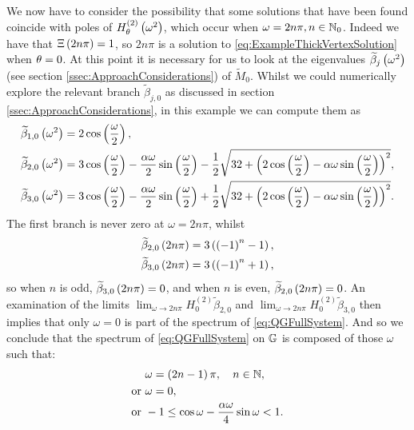 We now have to consider the possibility that some solutions that have been found coincide with poles of $H_\theta^{(2)}\left( \omega^2 \right)$, which occur when $\omega = 2n\pi, n\in\mathbb{N}_0$.
Indeed we have that $\Xi\left( 2n\pi \right)=1$, so $2n\pi$ is a solution to \eqref{eq:ExampleThickVertexSolution} when $\theta=0$.
At this point it is necessary for us to look at the eigenvalues $\widetilde{\beta}_j\left( \omega^2 \right)$ (see section \ref{ssec:ApproachConsiderations}) of $\tilde{M}_0$.
Whilst we could numerically explore the relevant branch $\widetilde{\beta}_{j,0}$ as discussed in section \ref{ssec:ApproachConsiderations}, in this example we can compute them as
\begin{align*}
	\widetilde{\beta}_{1,0}\left( \omega^2 \right) &= 2\cos\left( \frac{\omega}{2} \right), \\
	\widetilde{\beta}_{2,0}\left( \omega^2 \right) &= 3\cos\left( \frac{\omega}{2} \right) - \frac{\alpha\omega}{2}\sin\left( \frac{\omega}{2} \right) - \frac{1}{2}\sqrt{ 32 + \left(  2\cos\left( \frac{\omega}{2} \right) - \alpha\omega\sin\left( \frac{\omega}{2} \right)  \right)^2 }, \\
	\widetilde{\beta}_{3,0}\left( \omega^2 \right) &= 3\cos\left( \frac{\omega}{2} \right) - \frac{\alpha\omega}{2}\sin\left( \frac{\omega}{2} \right) + \frac{1}{2}\sqrt{ 32 + \left(  2\cos\left( \frac{\omega}{2} \right) - \alpha\omega\sin\left( \frac{\omega}{2} \right)  \right)^2 }.
\end{align*}
The first branch is never zero at $\omega=2n\pi$, whilst
\begin{align*}
	\widetilde{\beta}_{2,0}\left( 2n\pi \right) &= 3\left( \left( -1 \right)^n - 1 \right), \\
	\widetilde{\beta}_{3,0}\left( 2n\pi \right) &= 3\left( \left( -1 \right)^n + 1 \right),
\end{align*}
so when $n$ is odd, $\widetilde{\beta}_{3,0}\left( 2n\pi \right) = 0$, and when $n$ is even, $\widetilde{\beta}_{2,0}\left( 2n\pi \right) = 0$.
An examination of the limits $\lim_{\omega\rightarrow2n\pi}H_{0}^{(2)}\widetilde{\beta}_{2,0}$ and $\lim_{\omega\rightarrow2n\pi}H_{0}^{(2)}\widetilde{\beta}_{3,0}$ then implies that only $\omega=0$ is part of the spectrum of \eqref{eq:QGFullSystem}.
And so we conclude that the spectrum of \eqref{eq:QGFullSystem} on $\mathbb{G}$ is composed of those $\omega$ such that:
\begin{align*}
	&\omega = \left( 2n-1 \right)\pi, \quad n\in\mathbb{N}, \\
	\text{or } &\omega = 0, \\
	\text{or } & -1 \leq \cos\omega - \frac{\alpha\omega}{4}\sin\omega < 1.
\end{align*}

